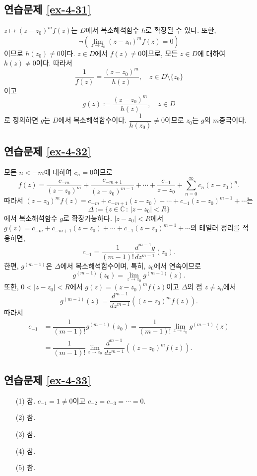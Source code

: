 \subsection*{연습문제 \ref{ex-4-31}}

$z\mapsto (z-z_0)^m f(z)$는 $D$에서 복소해석함수 $h$로 확장될 수 있다.
또한, 
\[
\neg\left( \lim_{z\to z_0} (z-z_0)^m f(z) = 0 \right)
\]
이므로 $h(z_0) \ne 0$이다. 
$z\in D$에서 $f(z)\ne0$이므로, 모든 $z\in D$에 대하여 $h(z)\ne0$이다.
따라서
\[
\dfrac1{f(z)} = \dfrac{(z-z_0)^m}{h(z)},
\quad z\in D\setminus \{z_0\}
\]
이고 
\[
g(z):= \dfrac{(z-z_0)^m}{h(z)},
\quad z\in D
\]
로 정의하면 $g$는 $D$에서 복소해석함수이다.
$\dfrac1{h(z_0)}\ne0$이므로 $z_0$는 $g$의 $m$중극이다.

\subsection*{연습문제 \ref{ex-4-32}}

모든 $n<-m$에 대하여 $c_n=0$이므로
\[
f(z) = \dfrac{c_{-m}}{(z-z_0)^m} + \dfrac{c_{-m+1}}{(z-z_0)^{m-1}}
+ \cdots + \dfrac{c_{-1}}{z-z_0} + \sum_{n=0}^\infty c_n(z-z_0)^n.
\]
따라서 $(z-z_0)^m f(z) = c_{-m} + c_{-m+1}(z-z_0) + \cdots + c_{-1}(z-z_0)^{m-1} + \cdots$는
\[
\Delta:= \{ z\in \mathbb C \,:\, |z-z_0|<R\}
\]
에서 복소해석함수 $g$로 확장가능하다.
$|z-z_0| <R$에서 
$g(z) = c_{-m} + c_{-m+1}(z-z_0) + \cdots + c_{-1}(z-z_0)^{m-1} + \cdots$의
테일러 정리를 적용하면,
\[
c_{-1} = \dfrac1{(m-1)!}\dfrac{d^{m-1}g}{dz^{m-1}}(z_0).
\]
한편, $g^{(m-1)}$은 $\Delta$에서 복소해석함수이며,
특히, $z_0$에서 연속이므로
\[
g^{(m-1)}(z_0) = \lim_{z\to z_0} g^{(m-1)}(z).
\]
또한, $0<|z-z_0|<R$에서 $g(z) = (z-z_0)^m f(z)$이고
$\Delta$의 점 $z\ne z_0$에서
\[
g^{(m-1)}(z) = \dfrac{d^{m-1}}{dz^{m-1}}((z-z_0)^m f(z)).
\]
따라서
\begin{align*}
c_{-1} &= \dfrac1{(m-1)!} g^{(m-1)}(z_0) 
= \dfrac1{(m-1)!} \lim_{z\to z_0} g^{(m-1)}(z) \\
&= \dfrac1{(m-1)!} \lim_{z\to z_0} \dfrac{d^{m-1}}{dz^{m-1}}((z-z_0)^m f(z)).
\end{align*}

\subsection*{연습문제 \ref{ex-4-33}}

\begin{itemize}
\item[(1)] 참. 
$c_{-1}=1\ne0$이고 $c_{-2} = c_{-3} = \cdots = 0$.
\item[(2)] 참.
\item[(3)] 참.
\item[(4)] 참.
\item[(5)] 참.
\end{itemize}

